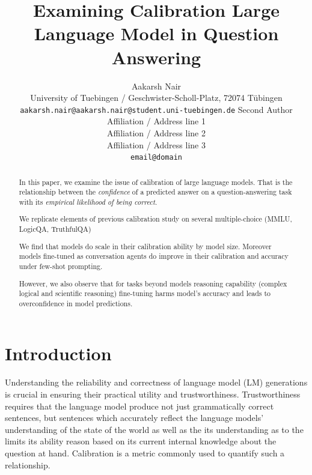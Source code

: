 \documentclass[11pt]{article}
\title{Examining Calibration Large Language Model in Question Answering}
\author{Aakarsh Nair\\
  University of Tuebingen / Geschwister-Scholl-Platz, 72074 Tübingen\\
  \texttt{aakarsh.nair@aakarsh.nair@student.uni-tuebingen.de} 
  Second Author \\
  Affiliation / Address line 1 \\
  Affiliation / Address line 2 \\
  Affiliation / Address line 3 \\
  \texttt{email@domain} \\}
\begin{document}
\maketitle


\begin{abstract}
In this paper, we examine the issue of calibration of 
large language models. 
That is the relationship between the \emph{confidence} 
of a predicted answer on a question-answering task 
with its \emph{empirical likelihood of being correct}.

We replicate elements of previous calibration study 
\cite{kadavath2022language} on several multiple-choice 
(MMLU, LogicQA, TruthfulQA) 

We find that models do scale in their calibration ability by 
model size. Moreover models fine-tuned as conversation agents 
do improve in their calibration and accuracy under 
few-shot prompting. 

However, we also observe that for tasks beyond models reasoning 
capability (complex logical and scientific reasoning) fine-tuning 
harms model's accuracy and leads to overconfidence 
in model predictions.

\end{abstract}


\section{Introduction}


Understanding the reliability and correctness of language model (LM) 
generations is crucial in ensuring their practical utility and trustworthiness.  Trustworthiness requires that the language model 
produce not just grammatically correct sentences, but sentences 
which accurately reflect the language models' understanding 
of the state of the world as well as the its understanding as to 
the limits its ability reason based on its current 
internal knowledge about the question at hand. Calibration is a metric commonly used to quantify such a relationship. 
\end{document}
